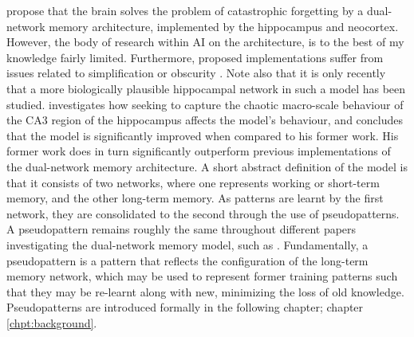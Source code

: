 \citet{McClelland1995} propose that the brain solves the problem of catastrophic forgetting by a dual-network memory architecture, implemented by the hippocampus and neocortex. However, the body of research within AI on the architecture, is to the best of my knowledge fairly limited. Furthermore, proposed implementations suffer from issues related to simplification or obscurity \citep{French1997, French2001, Hattori2010, Hattori2014}. Note also that it is only recently that a more biologically plausible hippocampal network in such a model has been studied. \citet{Hattori2014} investigates how seeking to capture the chaotic macro-scale behaviour of the CA3 region of the hippocampus affects the model's behaviour, and concludes that the model is significantly improved when compared to his former work. His former work does in turn significantly outperform previous implementations of the dual-network memory architecture. A short abstract definition of the model is that it consists of two networks, where one represents working or short-term memory, and the other long-term memory. As patterns are learnt by the first network, they are consolidated to the second through the use of pseudopatterns. A pseudopattern remains roughly the same throughout different papers investigating the dual-network memory model, such as \citep{French1997, Ans2000, French2001, Hattori2010, Hattori2014}. Fundamentally, a pseudopattern is a pattern that reflects the configuration of the long-term memory network, which may be used to represent former training patterns such that they may be re-learnt along with new, minimizing the loss of old knowledge. Pseudopatterns are introduced formally in the following chapter; chapter \ref{chpt:background}.
\\

